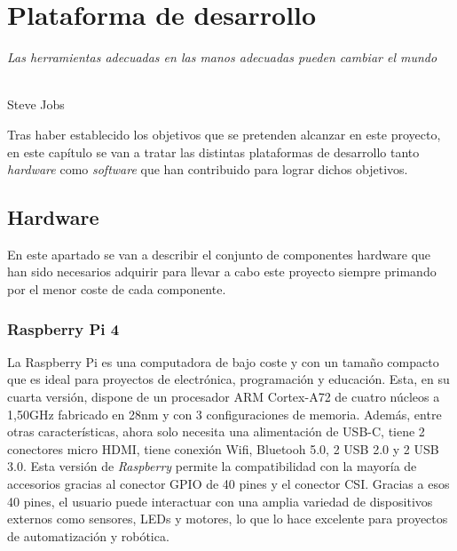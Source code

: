 \chapter{Plataforma de desarrollo}
\label{cap:capitulo3}

\begin{flushright}
\begin{minipage}[]{10cm}
\emph{Las herramientas adecuadas en las manos adecuadas pueden cambiar el mundo}\\
\end{minipage}\\

Steve Jobs\\
\end{flushright}

\vspace{1cm}

Tras haber establecido los objetivos que se pretenden alcanzar en este proyecto, en este capítulo se van a tratar las distintas plataformas de desarrollo tanto \textit{hardware} como \textit{software} que han contribuido para lograr dichos objetivos.

\section{Hardware}

En este apartado se van a describir el conjunto de componentes hardware que han sido necesarios adquirir para llevar a cabo este proyecto siempre primando por el menor coste de cada componente.

\subsection{Raspberry Pi 4}

La Raspberry Pi es una computadora de bajo coste y con un tamaño compacto que es ideal para proyectos de electrónica, programación y educación. Esta, en su cuarta versión, dispone de un procesador ARM Cortex-A72 de cuatro núcleos a 1,50GHz fabricado en 28nm y con 3 configuraciones de memoria. Además, entre otras características, ahora solo necesita una alimentación de USB-C, tiene 2 conectores micro HDMI, tiene conexión Wifi, Bluetooh 5.0, 2 USB 2.0 y 2 USB 3.0. Esta versión de \textit{Raspberry} permite la compatibilidad con la mayoría de accesorios gracias al conector GPIO de 40 pines y el conector \ac{CSI}. Gracias a esos 40 pines, el usuario puede interactuar con una amplia variedad de dispositivos externos como sensores, LEDs y motores, lo que lo hace excelente para proyectos de automatización y robótica. 

